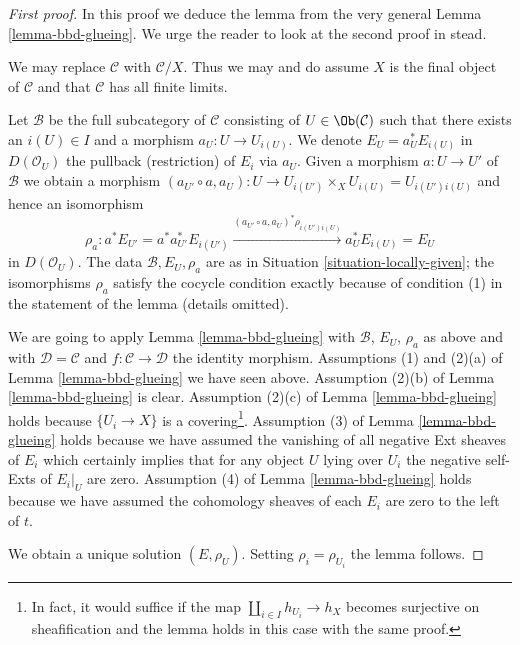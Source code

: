 \begin{proof}[First proof]
In this proof we deduce the lemma from the very general
Lemma \ref{lemma-bbd-glueing}. We urge the reader to look
at the second proof in stead.

\medskip\noindent
We may replace $\mathcal{C}$ with $\mathcal{C}/X$.
Thus we may and do assume $X$ is the final object of $\mathcal{C}$
and that $\mathcal{C}$ has all finite limits.

\medskip\noindent
Let $\mathcal{B}$ be the full subcategory of $\mathcal{C}$
consisting of $U \in \Ob(\mathcal{C})$ such that there exists
an $i(U) \in I$ and a morphism $a_U : U \to U_{i(U)}$.
We denote $E_U = a_U^*E_{i(U)}$ in $D(\mathcal{O}_U)$
the pullback (restriction) of $E_i$ via $a_U$.
Given a morphism $a : U \to U'$ of $\mathcal{B}$
we obtain a morphism
$(a_{U'} \circ a, a_U) : U \to U_{i(U')} \times_X U_{i(U)} = U_{i(U')i(U)}$
and hence an isomorphism
$$
\rho_a :
a^*E_{U'} = a^*a_{U'}^*E_{i(U')}
\xrightarrow{(a_{U'} \circ a, a_U)^*\rho_{i(U')i(U)}}
a_{U}^*E_{i(U)} = E_{U}
$$
in $D(\mathcal{O}_U)$. The data $\mathcal{B}, E_U, \rho_a$
are as in Situation \ref{situation-locally-given}; the
isomorphisms $\rho_a$ satisfy the cocycle condition
exactly because of condition (1) in the statement of the lemma
(details omitted).

\medskip\noindent
We are going to apply Lemma \ref{lemma-bbd-glueing} with $\mathcal{B}$,
$E_U$, $\rho_a$ as above and with $\mathcal{D} = \mathcal{C}$ and
$f : \mathcal{C} \to \mathcal{D}$ the identity morphism.
Assumptions (1) and (2)(a) of Lemma \ref{lemma-bbd-glueing} we have seen above.
Assumption (2)(b) of Lemma \ref{lemma-bbd-glueing} is clear.
Assumption (2)(c) of Lemma \ref{lemma-bbd-glueing} holds because
$\{U_i \to X\}$ is a covering\footnote{In fact, it would suffice
if the map $\coprod_{i \in I} h_{U_i} \to h_X$ becomes
surjective on sheafification and the lemma holds in this case
with the same proof.}.
Assumption (3) of Lemma \ref{lemma-bbd-glueing} holds
because we have assumed the vanishing of all negative Ext sheaves
of $E_i$ which certainly implies that for any object $U$ lying over $U_i$
the negative self-Exts of $E_i|_U$ are zero.
Assumption (4) of Lemma \ref{lemma-bbd-glueing} holds because
we have assumed the cohomology sheaves of each $E_i$ are zero
to the left of $t$.

\medskip\noindent
We obtain a unique solution $(E, \rho_U)$.
Setting $\rho_i = \rho_{U_i}$ the lemma follows.
\end{proof}

